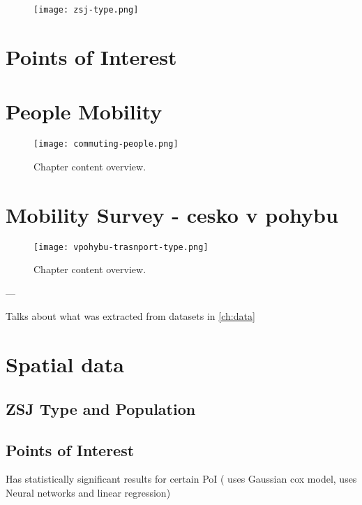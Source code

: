 \begin{figure}[hb]
    \texttt{[image: zsj-type.png]}
\end{figure}

\section{Points of Interest}


\section{People Mobility}

\begin{figure}[hb]
    \texttt{[image: commuting-people.png]}
    \caption[Problem modelling overview]{Chapter content overview. }
\end{figure}

\section{Mobility Survey - cesko v pohybu}

\begin{figure}[hb]
    \texttt{[image: vpohybu-trasnport-type.png]}
    \caption[Problem modelling overview]{Chapter content overview. }
\end{figure}

---

Talks about what was extracted from datasets in \ref{ch:data}

\section{Spatial data}

\subsection{ZSJ Type and Population}

\subsection{Points of Interest}

Has statistically significant results for certain PoI \cite{hechtGlobalElectricVehicle2024}\cite{dongElectricVehicleCharging2019}
(\cite{dongElectricVehicleCharging2019} uses Gaussian cox model, \cite{hechtGlobalElectricVehicle2024} uses Neural networks and linear regression)

